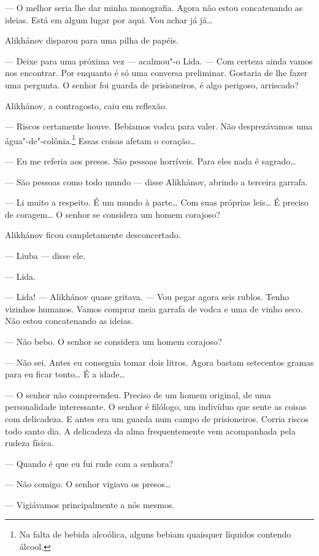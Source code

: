 --- O melhor seria lhe dar minha monografia. Agora não estou
concatenando as ideias. Está em algum lugar por aqui. Vou achar já já\ldots{}

Alikhánov disparou para uma pilha de papéis.

--- Deixe para uma próxima vez --- acalmou"-o Lida. --- Com certeza ainda
vamos nos encontrar. Por enquanto é só uma conversa preliminar. Gostaria
de lhe fazer uma pergunta. O senhor foi guarda de prisioneiros, é algo
perigoso, arriscado?

Alikhánov, a contragosto, caiu em reflexão.

--- Riscos certamente houve. Bebíamos vodca para valer. Não
desprezávamos uma água"-de"-colônia.\footnote{Na falta de bebida
  alcoólica, alguns bebiam quaisquer líquidos contendo álcool.} Essas
coisas afetam o coração\ldots{}

--- Eu me referia aos presos. São pessoas horríveis. Para eles nada é
sagrado\ldots{}

--- São pessoas como todo mundo --- disse Alikhánov, abrindo a terceira
garrafa.

--- Li muito a respeito. É um mundo à parte\ldots{} Com suas próprias leis\ldots{}
É preciso de coragem\ldots{} O senhor se considera um homem corajoso?

Alikhánov ficou completamente desconcertado.

--- Liuba --- disse ele.

--- Lida. \label{ref7}

--- Lida! --- Alikhánov quase gritava. --- Vou pegar agora seis rublos.
Tenho vizinhos humanos. Vamos comprar meia garrafa de vodca e uma de
vinho seco. Não estou concatenando as ideias.

--- Não bebo. O senhor se considera um homem corajoso?

--- Não sei. Antes eu conseguia tomar dois litros. Agora bastam
setecentos gramas para eu ficar tonto\ldots{} É a idade\ldots{}

--- O senhor não compreendeu. Preciso de um homem original, de uma \label{ref8}
personalidade interessante. O senhor é filólogo, um indivíduo que sente
as coisas com delicadeza. E antes era um guarda num campo de
prisioneiros. Corria riscos todo santo dia. A delicadeza da alma
frequentemente vem acompanhada pela rudeza física.

--- Quando é que eu fui rude com a senhora?

--- Não comigo. O senhor vigiava os presos\ldots{}

--- Vigiávamos principalmente a nós mesmos.

